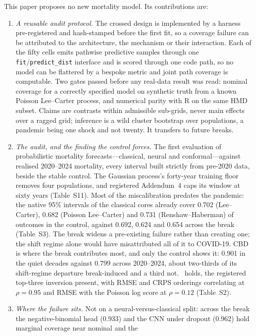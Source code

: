 This paper proposes no new mortality model. Its contributions are:
\begin{enumerate}
\item \emph{A reusable audit protocol.} The crossed design is implemented by
  a harness pre-registered and hash-stamped before the first fit, so a
  coverage failure can be attributed to the architecture, the mechanism or
  their interaction. Each of the fifty cells emits pathwise predictive
  samples through one \texttt{fit}/\texttt{predict\_dist} interface and is
  scored through one code path, so no model can be flattered by a bespoke
  metric and joint path coverage is computable. Two gates passed
  before any real-data result was read: nominal coverage for a correctly
  specified model on synthetic truth from a known Poisson Lee--Carter
  process, and numerical parity with R  on the same HMD subset.
  Claims are contrasts within admissible sub-grids, never main effects over
  a ragged grid; inference is a wild cluster bootstrap over populations, a
  pandemic being one shock and not twenty. It transfers to future breaks.
\item \emph{The audit, and the finding the control forces.} The first
  evaluation of probabilistic mortality forecasts---classical, neural and
  conformal---against realised 2020--2024 mortality, every interval built
  strictly from pre-2020 data, beside the stable control. The Gaussian
  process's forty-year training floor removes four populations, and registered
  Addendum~4 caps its window at sixty years
  (Table~S11). Most of the miscalibration predates the pandemic: the native
  95\% intervals of the classical cores already cover 0.702 (Lee--Carter),
  0.682 (Poisson Lee--Carter) and 0.731 (Renshaw--Haberman) of
  outcomes in the control, against 0.692, 0.624 and 0.654 across the break
  (Table~S3). The break widens a pre-existing failure rather than creating
  one; the shift regime alone would have misattributed all of it to
  COVID-19. CBD is where the break contributes most, and only the control
  shows it: 0.901 in the quiet decades against 0.799 across 2020--2024,
  about two-thirds of its shift-regime departure break-induced and a third
  not. \Hone\ holds, the registered top-three inversion present, with RMSE
  and CRPS orderings correlating at $\rho = 0.95$ and RMSE with the Poisson
  log score at $\rho = 0.12$ (Table~S2).
\item \emph{Where the failure sits.} Not on a neural-versus-classical split:
  across the break the negative-binomial head (0.933) and the
  CNN under dropout (0.962) hold marginal coverage near nominal and the

\end{enumerate}
